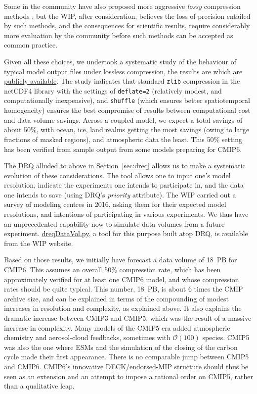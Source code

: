 \documentclass[gmd,manuscript]{copernicus}
\newcommand{\pipref}[1] {\citep{ref:#1}}
\newcommand{\secref}[1] {\mbox{Section  \ref{sec:#1}}}
\begin{document}
\begin{enumerate}
  Some in the community have also proposed more aggressive
  \emph{lossy} compression methods \pipref{bakeretal2016}, but the
  WIP, after consideration, believes the loss of precision entailed by
  such methods, and the consequences for scientific results, require
  considerably more evaluation by the community before such methods
  can be accepted as common practice.

  Given all these choices, we undertook a systematic study of the
  behaviour of typical model output files under lossless compression,
  the results are which are \href{https://goo.gl/qkdDnn}{publicly
    available}. The study indicates that standard \texttt{zlib}
  compression in the netCDF4 library with the settings of
  \texttt{deflate=2} (relatively modest, and computationally
  inexpensive), and \texttt{shuffle} (which ensures better
  spatiotemporal homogeneity) ensures the best compromise of results
  between computational cost and data volume savings. Across a coupled
  model, we expect a total savings of about 50\%, with ocean, ice,
  land realms getting the most savings (owing to large fractions of
  masked regions), and atmospheric data the least. This 50\% setting
  has been verified from sample output from some models preparing for
  CMIP6.
\end{enumerate}

The \href{https://goo.gl/iNBQ9m}{DRQ} alluded to above in
\secref{dreq} allows us to make a systematic evolution of these
considerations. The tool allows one to input one's model resolution,
indicate the experiments one intends to participate in, and the data
one intends to save (using DRQ's \emph{priority} attribute). The WIP
carried out a survey of modeling centres in 2016, asking them for
their expected model resolutions, and intentions of participating in
various experiments. We thus have an unprecedented capability now to
simulate data volumes from a future experiment.
\href{https://goo.gl/Ezz5v3}{dreqDataVol.py}, a tool for this purpose
built atop DRQ, is available from the WIP website.

Based on those results, we initially have forecast a data volume of
18~PB for CMIP6. This assumes an overall 50\% compression rate, which
has been approximately verified for at least one CMIP6 model, and
whose compression rates should be quite typical. This number, 18~PB,
is about 6 times the CMIP archive size, and can be explained in terms
of the compounding of modest increases in resolution and complexity,
as explained above. It also explains the dramatic increase between
CMIP3 and CMIP5, which was the result of a massive increase in
complexity. Many models of the CMIP5 era added atmospheric chemistry
and aerosol-cloud feedbacks, sometimes with $\mathcal{O}(100)$
species. CMIP5 was also the one where ESMs and the simulation of the
closing of the carbon cycle made their first appearance. There is no
comparable jump between CMIP5 and CMIP6. CMIP6's innovative
DECK/endorsed-MIP structure should thus be seen as an extension and an
attempt to impose a rational order on CMIP5, rather than a qualitative
leap.
\end{document}

